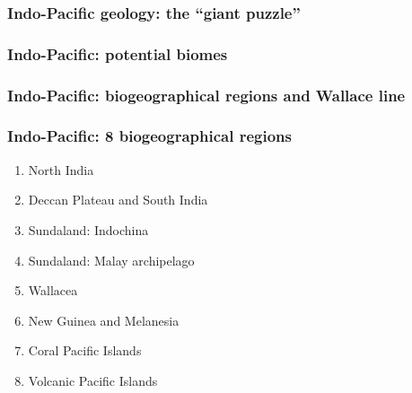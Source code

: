 \documentclass{beamer}
\newcommand{\Max}[1]{\texttt{[image: \#1]}}
\begin{document}

\begin{frame}
\frametitle{Indo-Pacific geology: the ``giant puzzle''}

\centering


\end{frame}


\begin{frame}
\frametitle{Indo-Pacific: potential biomes}

\centering


\end{frame}


\begin{frame}
\frametitle{Indo-Pacific: biogeographical regions and Wallace line}

\centering


\end{frame}


\begin{frame}
\frametitle{Indo-Pacific: 8 biogeographical regions}

\begin{enumerate}

\item North India

\item Deccan Plateau and South India

\item Sundaland: Indochina

\item Sundaland: Malay archipelago

\item Wallacea

\item New Guinea and Melanesia

\item Coral Pacific Islands

\item Volcanic Pacific Islands

\end{enumerate}

\end{frame}
\end{document}

